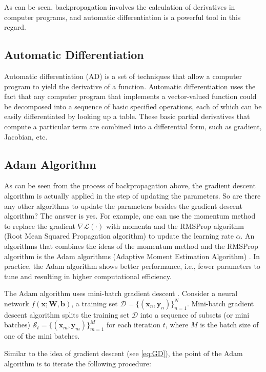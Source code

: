 \documentclass[
	parskip, 			   %
	twoside, 			   %
	DIV=14, 			   %
	BCOR=15.0mm, 		   %
	headsepline, 		   %
	open=right, 		   %
	captions=tableheading, %
	bibliography=totoc,    %
	numbers=noenddot       %
]{scrreprt}
\begin{document}
As can be seen, backpropagation involves the calculation of derivatives in computer programs, and automatic differentiation is a powerful tool in this regard.

\subsection{Automatic Differentiation}
Automatic differentiation (AD) is a set of techniques that allow a computer program to yield the derivative of a function. Automatic differentiation uses the fact that any computer program that implements a vector-valued function could be decomposed into a sequence of basic specified operations, each of which can be easily differentiated by looking up a table. These basic partial derivatives that compute a particular term are combined into a differential form, such as gradient, Jacobian, etc.

\subsection{Adam Algorithm}
As can be seen from the process of backpropagation above, the gradient descent algorithm is actually applied in the step of updating the parameters. So are there any other algorithms to update the parameters besides the gradient descent algorithm? The answer is yes. For example, one can use the momentum method to replace the gradient $\nabla \mathcal{L}(\cdot)$ with momenta and the RMSProp algorithm (Root Mean Squared Propagation algorithm) \cite{tieleman2012divide} to update the learning rate $\alpha$. An algorithms that combines the ideas of the momentum method and the RMSProp algorithm is the Adam algorithms (Adaptive Moment Estimation Algorithm) \cite{kingma2014adam}. In practice, the Adam algorithm shows better performance, i.e., fewer parameters to tune and resulting in higher computational efficiency.

The Adam algorithm uses mini-batch gradient descent \cite{bottou2010large}. Consider a neural network $f(\mathbf{x};\mathbf{W},\mathbf{b})$, a training set $\mathcal{D}=\{ (\mathbf{x}_{n}, \mathbf{y}_{n}) \}_{n=1}^{N}$. Mini-batch gradient descent algorithm splits the training set $\mathcal{D}$ into a sequence of subsets (or mini batches) $\mathcal{S}_t=\{(\mathbf{x}_{m}, \mathbf{y}_{m}) \}_{m=1}^{M}$ for each iteration $t$, where $M$ is the batch size of one of the mini batches.

Similar to the idea of gradient descent (see \ref{eq:GD}), the point of the Adam algorithm is to iterate the following procedure:
\end{document}
